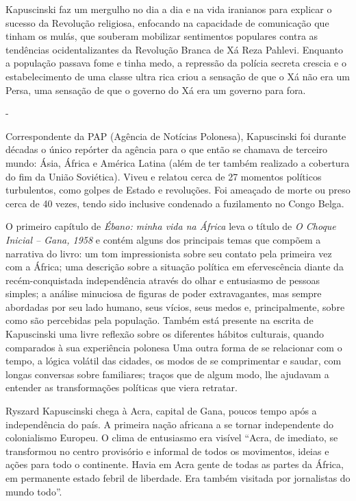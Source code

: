Kapuscinski faz um mergulho no dia a dia e na vida iranianos para
explicar o sucesso da Revolução religiosa, enfocando na capacidade de
comunicação que tinham os mulás, que souberam mobilizar sentimentos
populares contra as tendências ocidentalizantes da Revolução Branca de
Xá Reza Pahlevi. Enquanto a população passava fome e tinha medo, a
repressão da polícia secreta crescia e o estabelecimento de uma classe
ultra rica criou a sensação de que o Xá não era um Persa, uma sensação
de que o governo do Xá era um governo para fora.

-

Correspondente da PAP (Agência de Notícias Polonesa), Kapuscinski foi
durante décadas o único repórter da agência para o que então se chamava
de terceiro mundo: Ásia, África e América Latina (além de ter também
realizado a cobertura do fim da União Soviética). Viveu e relatou cerca
de 27 momentos políticos turbulentos, como golpes de Estado e
revoluções. Foi ameaçado de morte ou preso cerca de 40 vezes, tendo sido
inclusive condenado a fuzilamento no Congo Belga.

O primeiro capítulo de \emph{Ébano: minha vida na África} leva o título
de \emph{O Choque Inicial -- Gana, 1958} e contém alguns dos principais
temas que compõem a narrativa do livro: um tom impressionista sobre seu
contato pela primeira vez com a África; uma descrição sobre a situação
política em efervescência diante da recém-conquistada independência
através do olhar e entusiasmo de pessoas simples; a análise minuciosa de
figuras de poder extravagantes, mas sempre abordadas por seu lado
humano, seus vícios, seus medos e, principalmente, sobre como são
percebidas pela população. Também está presente na escrita de
Kapuscinski uma livre reflexão sobre os diferentes hábitos culturais,
quando comparados à sua experiência polonesa Uma outra forma de se
relacionar com o tempo, a lógica volátil das cidades, os modos de se
comprimentar e saudar, com longas conversas sobre familiares; traços que
de algum modo, lhe ajudavam a entender as transformações políticas que
viera retratar.

Ryszard Kapuscinski chega à Acra, capital de Gana, poucos tempo após a
independência do país. A primeira nação africana a se tornar
independente do colonialismo Europeu. O clima de entusiasmo era visível
``Acra, de imediato, se transformou no centro provisório e informal de
todos os movimentos, ideias e ações para todo o continente. Havia em
Acra gente de todas as partes da África, em permanente estado febril de
liberdade. Era também visitada por jornalistas do mundo todo''.

